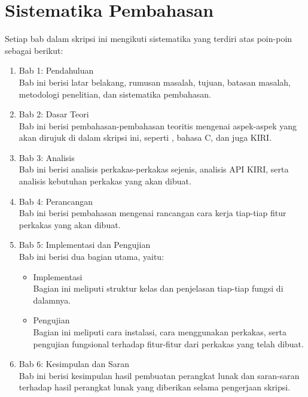 \section{Sistematika Pembahasan}
\label{sec:sispem}
Setiap bab dalam skripsi ini mengikuti sistematika yang terdiri atas poin-poin sebagai berikut:
\begin{enumerate}
	\item Bab 1: Pendahuluan \\
	Bab ini berisi latar belakang, rumusan masalah, tujuan, batasan masalah, metodologi \mbox{penelitian}, dan sistematika pembahasan.
	\item Bab 2: Dasar Teori \\
	Bab ini berisi pembahasan-pembahasan teoritis mengenai aspek-aspek yang akan dirujuk di dalam skripsi ini, seperti \cl, bahasa C, dan juga KIRI.
	\item Bab 3: Analisis \\
	Bab ini berisi analisis perkakas-perkakas sejenis, analisis API KIRI, serta analisis kebutuhan perkakas yang akan dibuat.
	\item Bab 4: Perancangan \\
	Bab ini berisi pembahasan mengenai rancangan cara kerja tiap-tiap fitur perkakas yang akan dibuat.
	\item Bab 5: Implementasi dan Pengujian \\
	Bab ini berisi dua bagian utama, yaitu:
	
	\begin{itemize}
		\item Implementasi \\
		Bagian ini meliputi struktur kelas dan penjelasan tiap-tiap fungsi di dalamnya.
		\item Pengujian \\
		Bagian ini meliputi cara instalasi, cara menggunakan perkakas, serta pengujian fungsional terhadap fitur-fitur dari perkakas yang telah dibuat.
	\end{itemize}
	
	\item Bab 6: Kesimpulan dan Saran \\
	Bab ini berisi kesimpulan hasil pembuatan perangkat lunak dan saran-saran terhadap hasil perangkat lunak yang diberikan selama pengerjaan skripsi.
\end{enumerate}